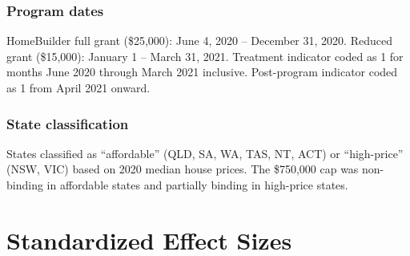 \documentclass[12pt]{article}
\begin{document}
\subsubsection*{Program dates} HomeBuilder full grant (\$25,000): June 4, 2020 -- December 31, 2020. Reduced grant (\$15,000): January 1 -- March 31, 2021. Treatment indicator coded as 1 for months June 2020 through March 2021 inclusive. Post-program indicator coded as 1 from April 2021 onward.

\subsubsection*{State classification} States classified as ``affordable'' (QLD, SA, WA, TAS, NT, ACT) or ``high-price'' (NSW, VIC) based on 2020 median house prices. The \$750,000 cap was non-binding in affordable states and partially binding in high-price states.

\section{Standardized Effect Sizes}
\label{sec:sde}


\end{document}
